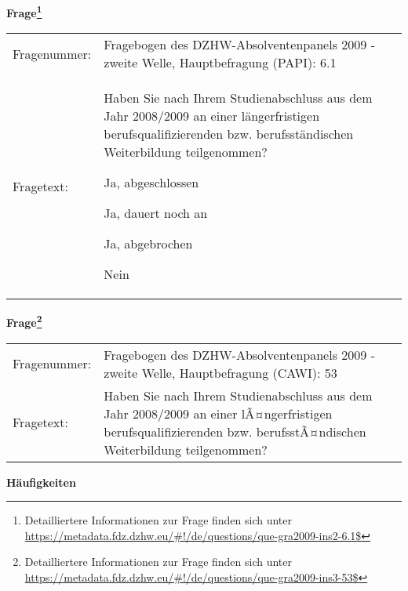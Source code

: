 				\vspace*{0.5cm}
                \noindent\textbf{Frage\footnote{Detailliertere Informationen zur Frage finden sich unter
		              \url{https://metadata.fdz.dzhw.eu/\#!/de/questions/que-gra2009-ins2-6.1$}}}\\
				\begin{tabularx}{\hsize}{@{}lX}
					Fragenummer: &
					  Fragebogen des DZHW-Absolventenpanels 2009 - zweite Welle, Hauptbefragung (PAPI):
					  6.1
 \\
					Fragetext: & Haben Sie nach Ihrem Studienabschluss aus dem Jahr 2008/2009 an einer längerfristigen berufsqualifizierenden bzw. berufsständischen Weiterbildung teilgenommen?\par  Ja, abgeschlossen\par  Ja, dauert noch an\par  Ja, abgebrochen\par  Nein \\
				\end{tabularx}
				\vspace*{0.5cm}
                \noindent\textbf{Frage\footnote{Detailliertere Informationen zur Frage finden sich unter
		              \url{https://metadata.fdz.dzhw.eu/\#!/de/questions/que-gra2009-ins3-53$}}}\\
				\begin{tabularx}{\hsize}{@{}lX}
					Fragenummer: &
					  Fragebogen des DZHW-Absolventenpanels 2009 - zweite Welle, Hauptbefragung (CAWI):
					  53
 \\
					Fragetext: & Haben Sie nach Ihrem Studienabschluss aus dem Jahr 2008/2009 an einer lÃ¤ngerfristigen berufsqualifizierenden bzw. berufsstÃ¤ndischen Weiterbildung teilgenommen? \\
				\end{tabularx}





        		\vspace*{0.5cm}
                \noindent\textbf{Häufigkeiten}

